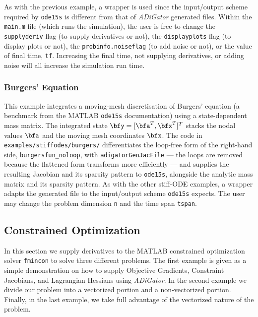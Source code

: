\documentclass[10pt,pdftex]{article}
\begin{document}
As with the previous example, a wrapper is used since the input/output scheme required by \texttt{ode15s} is different from that of \emph{ADiGator} generated files. Within the \texttt{main.m} file (which runs the simulation), the user is free to change the \texttt{supplyderiv} flag (to supply derivatives or not), the \texttt{displayplots} flag (to display plots or not), the \texttt{probinfo.noiseflag} (to add noise or not), or the value of final time, \texttt{tf}. Increasing the final time, not supplying derivatives, or adding noise will all increase the simulation run time.

\subsubsection{Burgers' Equation}
This example integrates a moving-mesh discretisation of Burgers' equation (a benchmark from the MATLAB \texttt{ode15s} documentation) using a state-dependent mass matrix. The integrated state $\bfy = [\bfa^T,\bfx^T]^T$ stacks the nodal values $\bfa$ and the moving mesh coordinates $\bfx$. The code in \texttt{examples/stiffodes/burgers/} differentiates the loop-free form of the right-hand side, \texttt{burgersfun\_noloop}, with \texttt{adigatorGenJacFile} --- the loops are removed because the flattened form transforms more efficiently --- and supplies the resulting Jacobian and its sparsity pattern to \texttt{ode15s}, alongside the analytic mass matrix and its sparsity pattern. As with the other stiff-ODE examples, a wrapper adapts the generated file to the input/output scheme \texttt{ode15s} expects. The user may change the problem dimension \texttt{n} and the time span \texttt{tspan}.
\subsection{Constrained Optimization}
In this section we supply derivatives to the MATLAB constrained optimization solver \texttt{fmincon} to solve three different problems. The first example is given as a simple demonstration on how to supply Objective Gradients, Constraint Jacobians, and Lagrangian Hessians using \emph{ADiGator}. In the second example we divide our problem into a vectorized portion and a non-vectorized portion. Finally, in the last example, we take full advantage of the vectorized nature of the problem.
\end{document}
